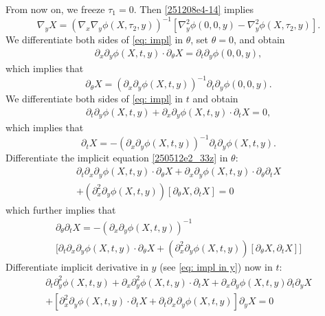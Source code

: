 \documentclass{article}
\numberwithin{equation}{section}
\theoremstyle{plain}
\begin{document}
\iffalse


From now on, we freeze $\tau_1=0$. Then \eqref{251208e4-14} implies
\begin{equation}
    \nabla_y X = (\nabla_x \nabla_y \phi(X, \tau_2, y))^{-1} [\nabla_y^2 \phi(0,0,y) - \nabla_y^2 \phi(X, \tau_2, y)].
\end{equation}
We differentiate both sides of \eqref{eq: impl} in $\theta$, set $\theta=0$, and obtain 
\begin{align}
    \partial_x \partial_y \phi(X, t, y) \cdot \partial_\theta X = \partial_t \partial_y \phi(0,0,y) \label{eq: impl in theta},
\end{align}
which implies that 
\begin{equation}\label{250512e2_32tt}
    \partial_\theta X = (\partial_x \partial_y \phi(X, t, y))^{-1} \partial_t \partial_y \phi(0,0,y).
\end{equation}
We differentiate both sides of \eqref{eq: impl} in $t$ and obtain 
\begin{align}\label{250512e2_33z}
    \partial_t \partial_y \phi(X, t, y) + \partial_x \partial_y \phi(X, t, y) \cdot \partial_t X = 0,
\end{align}
which implies that 
\begin{equation}
    \partial_t X = -(\partial_x\partial_y \phi(X, t, y))^{-1} \partial_t \partial_y \phi(X, t, y).
\end{equation}
Differentiate the implicit equation \eqref{250512e2_33z} in $\theta$: 
\begin{multline}\label{eq: impl in theta t}
   \partial_t \partial_x \partial_y \phi(X, t, y) \cdot \partial_\theta X + \partial_x \partial_y \phi(X, t, y) \cdot \partial_\theta \partial_t X \\
   + (\partial_x^2 \partial_y \phi(X, t, y))[\partial_\theta X, \partial_t X] = 0 
\end{multline}
which further implies that 
\begin{multline}
    \partial_\theta \partial_t X = -(\partial_x \partial_y \phi(X, t, y))^{-1} 
    \\
    \Big[\partial_t \partial_x \partial_y \phi(X, t, y) \cdot \partial_\theta X + (\partial_x^2 \partial_y \phi(X, t, y))[\partial_\theta X, \partial_t X]\Big]
\end{multline}
Differentiate implicit derivative in $y$ (see \eqref{eq: impl in y}) now in $t$: 
\begin{multline}
    \partial_t \partial_y^2 \phi(X, t, y) + \partial_x \partial_y^2 \phi(X, t, y) \cdot \partial_t X + \partial_x \partial_y \phi(X, t, y) \partial_t \partial_y X\\ + [\partial_x^2 \partial_y \phi(X, t, y) \cdot \partial_t X + \partial_t \partial_x \partial_y \phi(X, t, y)] \partial_y X = 0
\end{multline}
\end{document}
